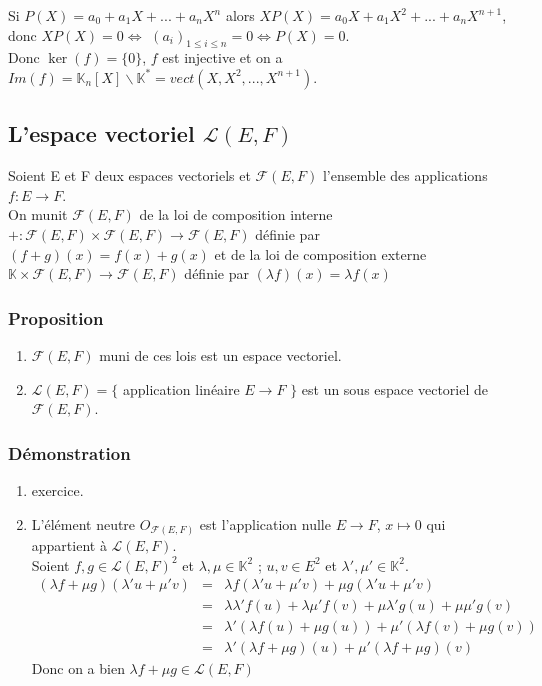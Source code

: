 \documentclass[a4paper,10pt]{book} %
\newcommand{\K}{\mathbb{K}}
\begin{document}
Si $P(X)=a_0+a_1X+...+a_n X^n$ alors $XP(X)=a_0X+a_1X^2+...+a_n X^{n+1}$,\\
donc $XP(X)=0 \Leftrightarrow$ $(a_i)_{1\leq i \leq n}=0 \Leftrightarrow P(X)=0$.\\

Donc $\ker(f)=\{ 0 \}$, $f$ est injective et on a $Im(f)=\K_n[X]\backslash \K^*=vect(X,X^2,...,X^{n+1})$.

\subsection{L'espace vectoriel $\mathcal{L}(E,F)$}
Soient E et F deux espaces vectoriels et $\mathcal{F}(E,F)$ l'ensemble des applications $f: E\rightarrow F$.\\
On munit $\mathcal{F}(E,F)$ de la loi de composition interne $+: \mathcal{F}(E,F)\times\mathcal{F}(E,F) \rightarrow \mathcal{F}(E,F)$ définie par $(f+g)(x)=f(x)+g(x)$ et de la loi de composition externe $\K\times \mathcal{F}(E,F) \rightarrow \mathcal{F}(E,F)$ définie par $(\lambda f)(x)=\lambda f(x)$

\subsubsection{Proposition}
\begin{enumerate}
\item $\mathcal{F}(E,F)$ muni de ces lois est un espace vectoriel.
\item $\mathcal{L}(E,F)=\{$ application linéaire $E\rightarrow F$ $\}$ est un sous espace vectoriel de $\mathcal{F}(E,F)$.
\end{enumerate}

\subsubsection{Démonstration}
\begin{enumerate}
\item exercice.

\item L'élément neutre $O_{\mathcal{F}(E,F)}$ est l'application nulle $E\rightarrow F$, $x\mapsto 0$ qui appartient à $\mathcal{L}(E,F)$.\\
Soient $f,g \in \mathcal{L}(E,F)^2$ et $\lambda, \mu \in \K^2$ ; $u,v \in E^2$ et $\lambda', \mu' \in \K^2$.\\

$\begin{array}{rcl}(\lambda f+\mu g)(\lambda' u+ \mu' v)&=&\lambda f(\lambda' u+\mu' v)+\mu g(\lambda 'u+\mu' v)\\
&=&\lambda\lambda'f(u)+\lambda\mu'f(v)+\mu\lambda'g(u)+\mu\mu'g(v) \\
&=& \lambda'(\lambda f(u)+\mu g(u))+\mu'(\lambda f(v)+\mu g(v))\\
&=& \lambda'(\lambda f+\mu g)(u)+\mu'(\lambda f+\mu g)(v)
\end{array}$\\

Donc on a bien $\lambda f+\mu g\in \mathcal{L}(E,F)$
\end{enumerate}
\end{document}
